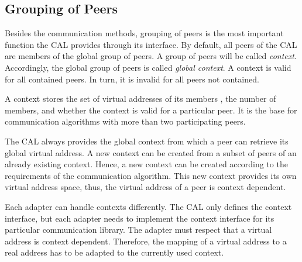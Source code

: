 \subsection{Grouping of Peers}
\label{sec:cal_context}
Besides the communication methods, grouping of peers is the most
important function the CAL provides through its interface.  By
default, all peers of the CAL are members of the global group of peers.
A group of peers will be called \textit{context}. Accordingly, the
global group of peers is called \emph{global context}. A context is valid for
all contained peers. In turn, it is invalid for all peers not
contained.

A context stores the set of virtual addresses of its members , the
number of members, and whether the context is valid for a particular
peer. It is the base for communication algorithms with more than two
participating peers.

The CAL always provides the global context from which a peer can
retrieve its global virtual address. A new context can be created from
a subset of peers of an already existing context. Hence, a new context
can be created according to the requirements of the communication
algorithm. This new context provides its own virtual address space,
thus, the virtual address of a peer is context dependent.

Each adapter can handle contexts differently. The CAL only
defines the context interface, but each adapter needs to implement the
context interface for its particular communication
library. The adapter must respect that a virtual address
is context dependent. Therefore, the mapping of a virtual address to a
real address has to be adapted to the currently used context.

